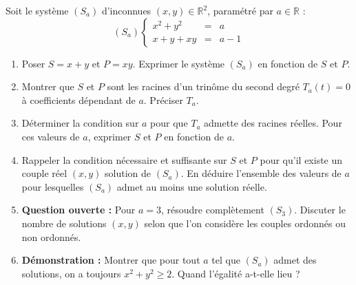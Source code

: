 \documentclass[11pt]{article}
\begin{document}
\begin{exercice}
Soit le système $(S_a)$ d'inconnues $(x,y) \in \mathbb{R}^2$, paramétré par $a \in \mathbb{R}$ :
\[
(S_a) \left\{ \begin{array}{rcl}
x^2 + y^2 &=& a \\
x + y + xy &=& a - 1
\end{array} \right.
\]
\begin{enumerate}
    \item Poser $S = x+y$ et $P = xy$. Exprimer le système $(S_a)$ en fonction de $S$ et $P$.
    \item Montrer que $S$ et $P$ sont les racines d'un trinôme du second degré $T_a(t)=0$ à coefficients dépendant de $a$. Préciser $T_a$.
    \item Déterminer la condition sur $a$ pour que $T_a$ admette des racines réelles. Pour ces valeurs de $a$, exprimer $S$ et $P$ en fonction de $a$.
    \item Rappeler la condition nécessaire et suffisante sur $S$ et $P$ pour qu'il existe un couple réel $(x,y)$ solution de $(S_a)$. En déduire l'ensemble des valeurs de $a$ pour lesquelles $(S_a)$ admet au moins une solution réelle.
    \item \textbf{Question ouverte :} Pour $a=3$, résoudre complètement $(S_3)$. Discuter le nombre de solutions $(x,y)$ selon que l'on considère les couples ordonnés ou non ordonnés.
    \item \textbf{Démonstration :} Montrer que pour tout $a$ tel que $(S_a)$ admet des solutions, on a toujours $x^2+y^2 \geqslant 2$. Quand l'égalité a-t-elle lieu ?
\end{enumerate}
\end{exercice}
\end{document}
